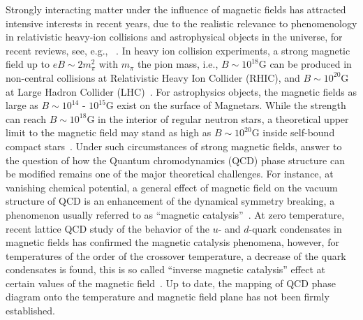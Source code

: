 \documentclass[prd, showpacs,nofootinbib,amsmath,amssymb]{revtex4}
\begin{document}
Strongly interacting matter under the influence of magnetic fields has attracted intensive interests
in recent years, due to the realistic relevance to phenomenology in relativistic heavy-ion collisions
and astrophysical objects in the universe, for recent reviews, see, e.g., ~\cite{andersen2016phase,kharzeev2013strongly}.
In heavy ion collision experiments, a strong magnetic field up to $eB \sim 2m_{\pi}^2$ with $m_{\pi}$
the pion mass, i.e., $B \sim 10^{18}\text{G}$ can be produced in non-central collisions at Relativistic Heavy
Ion Collider (RHIC), and $B \sim 10^{20}\text{G}$ at Large Hadron Collider (LHC)~\cite{kharzeev2008,skokov2009}.
For astrophysics objects, the magnetic fields as large as
$B \sim 10^{14}$ - $10^{15}\text{G}$ exist on the surface of Magnetars. While the strength
can reach $B \sim 10^{18}\text{G}$ in the interior of regular neutron stars, a theoretical upper limit to the magnetic field may stand as high as $B \sim 10^{20}\text{G}$ inside self-bound compact stars~\cite{dong2001,lai1991cold}.
Under such circumstances of strong magnetic fields,
answer to the question of how the Quantum chromodynamics (QCD) phase structure can be modified remains
one of the major theoretical challenges. For instance, at vanishing chemical potential, a general effect
of magnetic field on the vacuum structure of QCD is an enhancement of the dynamical symmetry breaking,
a phenomenon usually referred to as ``magnetic catalysis''~\cite{miransky2015quantum}. At zero
temperature, recent lattice QCD study of the behavior of the $u$- and $d$-quark condensates in
magnetic fields has confirmed the magnetic catalysis phenomena, however, for temperatures of the order of
the crossover temperature, a decrease of the quark condensates is found, this is so called ``inverse
magnetic catalysis'' effect at certain values of the magnetic
field~\cite{bali2012,miransky2002,fukushima2012}.
Up to date, the mapping of QCD phase diagram onto the temperature and 
magnetic field plane has not been firmly established.
\end{document}
